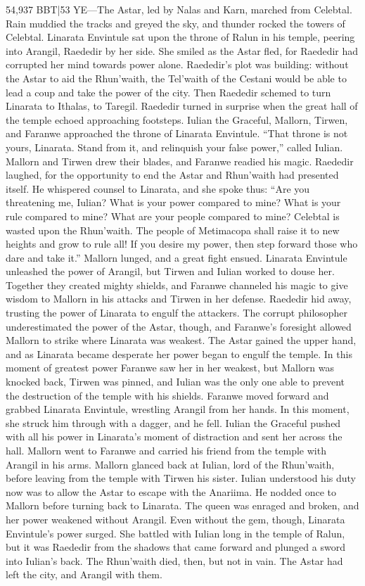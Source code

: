 \documentclass[smalldemyvopaper,11pt,twoside,onecolumn,openright,extrafontsizes]{memoir}
\begin{document}
{{54,937 BBT|53 YE—The Astar, led by Nalas and Karn, marched from Celebtal. Rain muddied the tracks and greyed the sky, and thunder rocked the towers of Celebtal. Linarata Envintule sat upon the throne of Ralun in his temple, peering into Arangil, Raededir by her side. She smiled as the Astar fled, for Raededir had corrupted her mind towards power alone. Raededir’s plot was building: without the Astar to aid the Rhun’waith, the Tel’waith of the Cestani would be able to lead a coup and take the power of the city. Then Raededir schemed to turn Linarata to Ithalas, to Taregil. Raededir turned in surprise when the great hall of the temple echoed approaching footsteps.
	Iulian the Graceful, Mallorn, Tirwen, and Faranwe approached the throne of Linarata Envintule.
	“That throne is not yours, Linarata. Stand from it, and relinquish your false power,” called Iulian. Mallorn and Tirwen drew their blades, and Faranwe readied his magic.
	Raededir laughed, for the opportunity to end the Astar and Rhun’waith had presented itself. He whispered counsel to Linarata, and she spoke thus:
	“Are you threatening me, Iulian? What is your power compared to mine? What is your rule compared to mine? What are your people compared to mine? Celebtal is wasted upon the Rhun’waith. The people of Metimacopa shall raise it to new heights and grow to rule all! If you desire my power, then step forward those who dare and take it.”
	Mallorn lunged, and a great fight ensued. Linarata Envintule unleashed the power of Arangil, but Tirwen and Iulian worked to douse her. Together they created mighty shields, and Faranwe channeled his magic to give wisdom to Mallorn in his attacks and Tirwen in her defense. Raededir hid away, trusting the power of Linarata to engulf the attackers. The corrupt philosopher underestimated the power of the Astar, though, and Faranwe’s foresight allowed Mallorn to strike where Linarata was weakest. The Astar gained the upper hand, and as Linarata became desperate her power began to engulf the temple. In this moment of greatest power Faranwe saw her in her weakest, but Mallorn was knocked back, Tirwen was pinned, and Iulian was the only one able to prevent the destruction of the temple with his shields. Faranwe moved forward and grabbed Linarata Envintule, wrestling Arangil from her hands. In this moment, she struck him through with a dagger, and he fell. Iulian the Graceful pushed with all his power in Linarata’s moment of distraction and sent her across the hall. Mallorn went to Faranwe and carried his friend from the temple with Arangil in his arms. Mallorn glanced back at Iulian, lord of the Rhun’waith, before leaving from the temple with Tirwen his sister. Iulian understood his duty now was to allow the Astar to escape with the Anariima. He nodded once to Mallorn before turning back to Linarata. The queen was enraged and broken, and her power weakened without Arangil. Even without the gem, though, Linarata Envintule’s power surged. She battled with Iulian long in the temple of Ralun, but it was Raededir from the shadows that came forward and plunged a sword into Iulian’s back. The Rhun’waith died, then, but not in vain. The Astar had left the city, and Arangil with them.
}}
\end{document}
